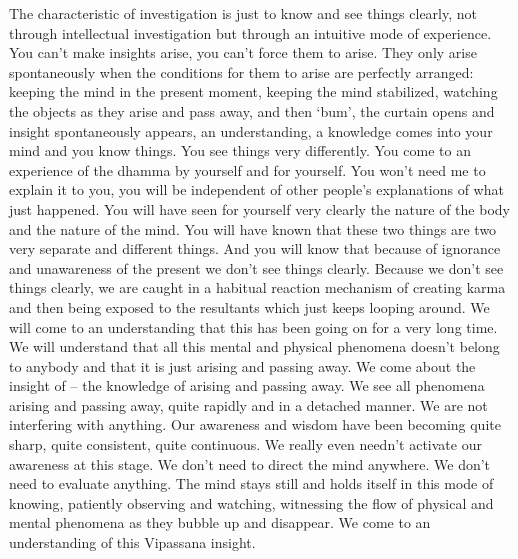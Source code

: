 \documentclass[letterpaper,10pt,english]{sphinxmanual}
\begin{document}
\sphinxAtStartPar
The  characteristic  of  investigation  is  just  to  know  and  see  things
clearly, not through intellectual investigation but through an intuitive mode
  of experience. You can’t make insights arise, you can’t force them to arise.
They only arise spontaneously when the conditions for them to arise are perfectly arranged: keeping the mind in the present moment, keeping the mind
stabilized, watching the objects as they arise and pass away, and then ‘bum’,
the  curtain  opens  and  insight  spontaneously  appears,  an  understanding,  a
knowledge comes into your mind and you know things. You see things very
differently. You come to an experience of the dhamma by yourself and for
yourself. You won’t need me to explain it to you, you will be independent
of other people’s explanations of what just happened. You will have seen for
yourself very clearly the nature of the body and the nature of the mind. You
will have known that these two things are two very separate and different
things. And  you  will  know  that  because  of  ignorance  and  unawareness  of
the present we don’t see things clearly. Because we don’t see things clearly,
we are caught in a habitual reaction mechanism of creating karma and then
being  exposed  to  the  resultants  which  just  keeps  looping  around. We  will
come to an understanding that this has been going on for a very long time.
We  will  understand  that  all  this  mental  and  physical  phenomena  doesn’t
belong  to  anybody  and  that  it  is  just  arising  and  passing  away.  We  come
about the insight of
– the knowledge of arising and passing away. We see all phenomena arising and passing away, quite rapidly and
in a detached manner. We are not interfering with anything. Our awareness
and wisdom have been becoming quite sharp, quite consistent, quite continuous. We really even needn’t activate our awareness at this stage. We don’t
need to direct the mind anywhere. We don’t need to evaluate anything. The
mind stays still and holds itself in this mode of knowing, patiently observing and watching, witnessing the flow of physical and mental phenomena as
they bubble up and disappear. We come to an understanding of this Vipassana insight.
\end{document}
